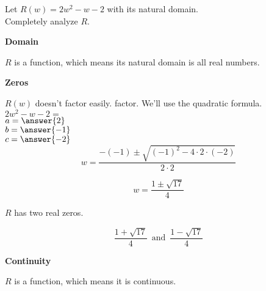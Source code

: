 \documentclass{ximera}
\author{Lee Wayand}
\begin{document}
\begin{exercise} 




Let $R(w) = 2w^2 - w - 2$ with its natural domain. \\


Completely analyze $R$. \\


\begin{question}  \textbf{\textcolor{blue!55!black}{Domain}}


$R$ is a  function, which means its natural domain is all real numbers.

\end{question}








\begin{question}  \textbf{\textcolor{blue!55!black}{Zeros}}


$R(w)$ doesn't factor easily. factor.  We'll use the quadratic formula.\\

$2w^2 - w - 2 = $ \\


$a = \answer{2}$ \\

$b = \answer{-1}$ \\

$c = \answer{-2}$ \\


\[
w = \frac{-(-1) \pm \sqrt{(-1)^2 - 4 \cdot 2 \cdot (-2)}}{2 \cdot 2}
\]


\[
w = \frac{1 \pm \sqrt{17}}{4}
\]




$R$ has two real zeros.

\[
\frac{1 + \sqrt{17}}{4} \, \text{ and } \, \frac{1 - \sqrt{17}}{4}
\]


\end{question}







\begin{question}  \textbf{\textcolor{blue!55!black}{Continuity}}


$R$ is a  function, which means it is continuous.

\end{question}










\end{exercise}
\end{document}
